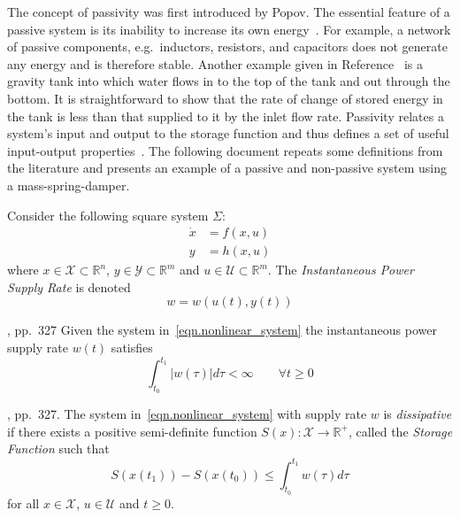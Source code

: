 The concept of passivity was first introduced by Popov.
The essential feature of a passive system is its inability to increase its own energy~\cite{terrell.stability.2009}.
For example, a network of passive components, e.g.\ inductors, resistors, and capacitors does not generate any energy and is therefore stable.
Another example given in Reference~\cite{bao.process.2007} is a gravity tank into which water flows in to the top of the tank and out through the bottom.
It is straightforward to show that the rate of change of stored energy in the tank is less than that supplied to it by the inlet flow rate.
Passivity relates a system's input and output to the storage function and thus defines a set of useful input-output properties~\cite{bao.process.2007}.
The following document repeats some definitions from the literature and presents an example of a passive and non-passive system using a mass-spring-damper.


Consider the following square system $\Sigma$:
\begin{equation}
  \label{eqn.nonlinear_system}
  \begin{split}
    \dot{x} & = f(x,u) \\
    y & = h(x,u)
  \end{split}
\end{equation}
where $x\in \mathcal{X}\subset\mathbb{R}^{n}$, $y\in \mathcal{Y}\subset\mathbb{R}^{m}$ and $u\in \mathcal{U}\subset\mathbb{R}^{m}$.
The \textit{Instantaneous Power Supply Rate} is denoted~\cite{willems.part1.1972}
\begin{equation}
  w=w(u(t),y(t))
\end{equation}

\begin{ass-dan} $ $\cite{willems.part1.1972}, pp.~327
  Given the system in~\eqref{eqn.nonlinear_system} the instantaneous power supply rate $w(t)$ satisfies
  \begin{equation*}
    \int_{t_{0}}^{t_{1}}|w(\tau)|d\tau<\infty
    \qquad
    \forall t\geq0
  \end{equation*}
\end{ass-dan}

\begin{defn-dan}\label{defn.dissipative}\cite{willems.part1.1972}, pp.~327.
  The system in~\eqref{eqn.nonlinear_system} with supply rate $w$ is \textit{dissipative} if there exists a positive semi-definite function $S(x):\mathcal{X}\rightarrow\mathbb{R}^{+}$, called the \textit{Storage Function} such that
  \begin{equation}
    \label{eqn.storage_inequality}
    S(x(t_{1}))-S(x(t_{0}))\leq\int_{t_{0}}^{t_{1}}w(\tau)d\tau
  \end{equation}
  for all $x\in \mathcal{X}$, $u\in \mathcal{U}$ and $t\geq0$.
\end{defn-dan}

